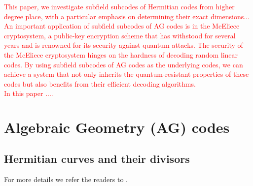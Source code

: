 \documentclass[a4paper]{amsart}
\theoremstyle{plain}
\theoremstyle{definition}
\theoremstyle{remark}
\begin{document}
\textcolor{red}{	This paper, we investigate subfield subcodes of Hermitian codes from higher degree place, with a particular emphasis on determining their exact dimensions...  \\An important application of subfield subcodes of AG codes is in the McEliece cryptosystem, a public-key encryption scheme that has withstood for several years and is renowned for its security against quantum attacks. The security of the McEliece cryptosystem hinges on the hardness of decoding random linear codes. By using subfield subcodes of AG codes as the underlying codes, we can achieve a system that not only inherits the quantum-resistant properties of these codes but also benefits from their efficient decoding algorithms.\\
	In this paper ....}


\section{Algebraic Geometry (AG) codes \label{sec}}

\subsection*{Hermitian curves and their divisors}

For more details we refer the readers to \cite{stichtenoth2009algebraic, stepanov2012codes}.
\end{document}
